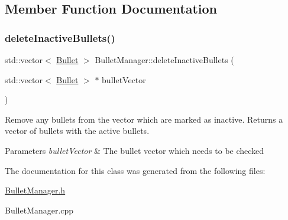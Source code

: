 \subsection{Member Function Documentation}
\mbox{\label{class_bullet_manager_a834ec287e01fc2ed7c5d3885e4b380c6}} 
\subsubsection{\texorpdfstring{delete\+Inactive\+Bullets()}{deleteInactiveBullets()}}
{\footnotesize\ttfamily std\+::vector$<$ \hyperlink{class_bullet}{Bullet} $>$ Bullet\+Manager\+::delete\+Inactive\+Bullets (\begin{DoxyParamCaption}\item[{std\+::vector$<$ \hyperlink{class_bullet}{Bullet} $>$ $\ast$}]{bullet\+Vector }\end{DoxyParamCaption})}



Remove any bullets from the vector which are marked as inactive. Returns a vector of bullets with the active bullets. 


\begin{DoxyParams}{Parameters}
{\em bullet\+Vector} & The bullet vector which needs to be checked \\
\hline
\end{DoxyParams}


The documentation for this class was generated from the following files\+:\begin{DoxyCompactItemize}
\item 
\hyperlink{_bullet_manager_8h}{Bullet\+Manager.\+h}\item 
Bullet\+Manager.\+cpp\end{DoxyCompactItemize}

